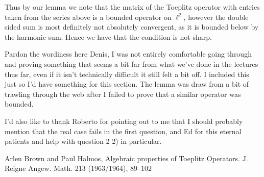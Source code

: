 \documentclass[10pt,a4paper]{article}
\begin{document}
Thus by our lemma we note that the matrix of the Toeplitz operator with entries taken from the series above is a bounded operator on $\ell^2$, however the double sided sum is most definitely not absolutely convergent, as it is bounded below by the harmonic sum. Hence we have that the condition is not sharp.

\vspace{9em}

Pardon the wordiness here Denis, I was not entirely comfortable going through and proving something that seems a bit far from what we've done in the lectures thus far, even if it isn't technically difficult it still felt a bit off. I included this just so I'd have something for this section. The lemma was draw from a bit of trawling through the web after I failed to prove that a similar operator was bounded.

I'd also like to thank Roberto for pointing out to me that I should probably mention that the real case fails in the first question, and Ed for this eternal patients and help with question 2 2) in particular.

\begin{thebibliography}{1}

  Arlen Brown and Paul Halmos,
  Algebraic properties of Toeplitz Operators.
  J. Reigne Angew.
 Math. 213 (1963/1964), 89–102

\end{thebibliography}
\end{document}
